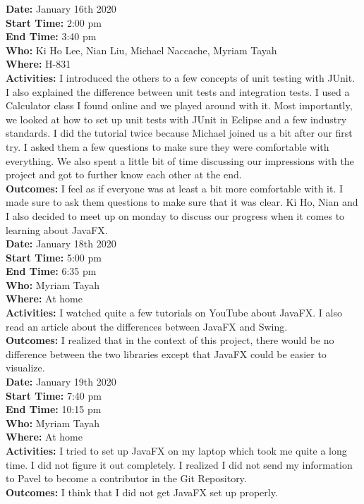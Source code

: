 \documentclass[12pt]{article}
\begin{document}
{\bf Date:} January 16th 2020\\
{\bf Start Time:} 2:00 pm\\
{\bf End Time:} 3:40 pm \\
{\bf Who:} Ki Ho Lee, Nian Liu, Michael Naccache, Myriam Tayah\\
{\bf Where:} H-831 \\
{\bf Activities:} I introduced the others to a few concepts of unit testing with JUnit. I also explained the difference between unit tests and integration tests. I used a Calculator class I found online and we played around with it. Most importantly, we looked at how to set up unit tests with JUnit in Eclipse and a few industry standards. I did the tutorial twice because Michael joined us a bit after our first try. I asked them a few questions to make sure they were comfortable with everything. We also spent a little bit of time discussing our impressions with the project and got to further know each other at the end. \\
{\bf Outcomes:} I feel as if everyone was at least a bit more comfortable with it. I made sure to ask them questions to make sure that it was clear. Ki Ho, Nian and I also decided to meet up on monday to discuss our progress when it comes to learning about JavaFX.\\

{\bf Date:} January 18th 2020\\
{\bf Start Time:} 5:00 pm\\
{\bf End Time:} 6:35 pm \\
{\bf Who:} Myriam Tayah \\
{\bf Where:} At home \\
{\bf Activities:} I watched quite a few tutorials on YouTube about JavaFX. I also read an article about the differences between JavaFX and Swing.\\
{\bf Outcomes:} I realized that in the context of this project, there would be no difference between the two libraries except that JavaFX could be easier to visualize.\\

{\bf Date:} January 19th 2020\\
{\bf Start Time:} 7:40 pm\\
{\bf End Time:} 10:15 pm \\
{\bf Who:} Myriam Tayah \\
{\bf Where:} At home \\
{\bf Activities:} I tried to set up JavaFX on my laptop which took me quite a long time. I did not figure it out completely. I realized I did not send my information to Pavel to become a contributor in the Git Repository. \\
{\bf Outcomes:} I think that I did not get JavaFX set up properly.\\
\end{document}

